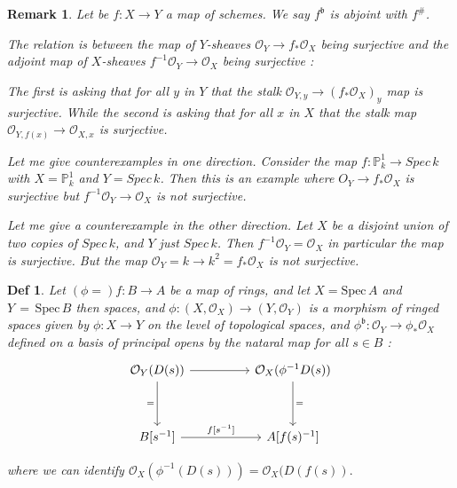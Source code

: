 \documentclass{article}
\newtheorem{definition}[theorem]{Def}
\newtheorem{remark}[theorem]{Remark}
\begin{document}
\begin{remark}
Let be $f:X\to Y$ a map of schemes. We say $f^{\mathfrak b}$ is abjoint with $f^{\#}$. 

The relation is between the map of $Y$-sheaves $\mathcal O_Y\to f_\ast \mathcal O_X$ being surjective and the adjoint map of $X$-sheaves $f^{-1}\mathcal O_Y\to \mathcal O_X$ being surjective :

The first is asking that for all $y$ in $Y$ that the stalk $\mathcal O_{Y,y}\to (f_\ast\mathcal O_X)_y$ map is surjective. While the second is asking that for all $x$ in $X$ that the stalk map $\mathcal O_{Y,f(x)}\to \mathcal O_{X,x}$ is surjective. 

Let me give counterexamples in one direction. Consider the map $f:\mathbb P^1_k\to Spec\, k$ with $X=\mathbb P^1_k$ and $Y=Spec\, k$. 
Then this is an example where $O_Y\to f_\ast\mathcal O_X$ is surjective but $f^{-1}\mathcal O_Y\to\mathcal O_X$ is not surjective.

Let me give a counterexample in the other direction. Let $X$ be a disjoint union of two copies of $Spec\, k$, and $Y$ just $Spec\, k$. Then $f^{-1}\mathcal O_Y=\mathcal O_X$ in particular the map is surjective. But the map $\mathcal O_Y=k\to k^2=f_\ast\mathcal O_X$ is not surjective.

\end{remark}

\begin{definition}
Let $(\phi=)f:B \rightarrow A$ be a map of rings, and let $X={\mathrm{Spec}}\,A$ and $Y\,=\,\mathrm{Spec}\,B$ then spaces, and $\phi:(X,{\mathcal O}_{X})\to(Y,{\mathcal O}_{Y})$ is a morphism of ringed spaces given by $\phi:X\to Y$ on the level of topological spaces, and $\phi^{\mathfrak b}:{\mathcal{O}}_{Y}\to\phi_{\ast}\mathcal{O}_{X}$ defined on a basis of principal opens by the nataral map for all $s\in B$ :
\[\begin{tikzcd}
	{\mathcal O_{Y}(D(s))} && {\mathcal O_{X}(\phi^{-1}D(s))} \\
	\\
	{B[s^{-1}]} && {A[f (s)^{-1}]}
	\arrow["{=}"', from=1-1, to=3-1]
	\arrow["{=}", from=1-3, to=3-3]
	\arrow[from=1-1, to=1-3]
	\arrow["{f[s^{-1}]}", from=3-1, to=3-3]
\end{tikzcd}\]

where we can identify ${\mathcal{O}}_{X}(\phi^{-1}(D(s)))={\mathcal{O}}_{X}(D(f(s)).$ 
\end{definition}
\end{document}
